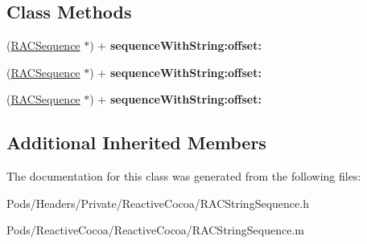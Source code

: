 \subsection*{Class Methods}
\begin{DoxyCompactItemize}
\item 
\mbox{\label{interface_r_a_c_string_sequence_a412b64b460437ebdfc18d8488e07bb6f}} 
(\mbox{\hyperlink{interface_r_a_c_sequence}{R\+A\+C\+Sequence}} $\ast$) + {\bfseries sequence\+With\+String\+:offset\+:}
\item 
\mbox{\label{interface_r_a_c_string_sequence_a412b64b460437ebdfc18d8488e07bb6f}} 
(\mbox{\hyperlink{interface_r_a_c_sequence}{R\+A\+C\+Sequence}} $\ast$) + {\bfseries sequence\+With\+String\+:offset\+:}
\item 
\mbox{\label{interface_r_a_c_string_sequence_a412b64b460437ebdfc18d8488e07bb6f}} 
(\mbox{\hyperlink{interface_r_a_c_sequence}{R\+A\+C\+Sequence}} $\ast$) + {\bfseries sequence\+With\+String\+:offset\+:}
\end{DoxyCompactItemize}
\subsection*{Additional Inherited Members}


The documentation for this class was generated from the following files\+:\begin{DoxyCompactItemize}
\item 
Pods/\+Headers/\+Private/\+Reactive\+Cocoa/R\+A\+C\+String\+Sequence.\+h\item 
Pods/\+Reactive\+Cocoa/\+Reactive\+Cocoa/R\+A\+C\+String\+Sequence.\+m\end{DoxyCompactItemize}
